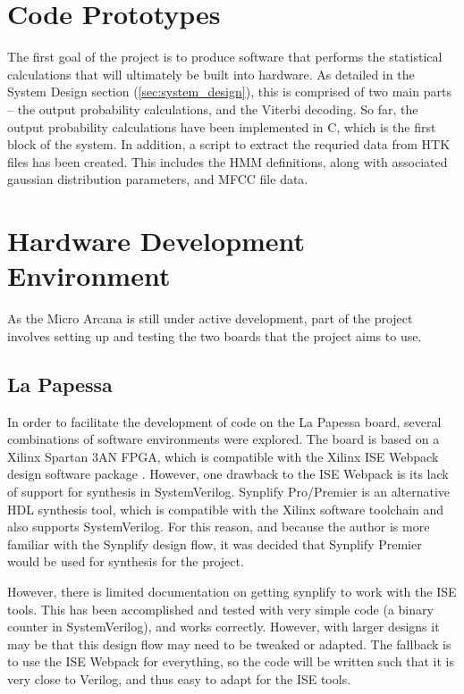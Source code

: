 \section{Code Prototypes} %
\label{sec:code_prototypes}
The first goal of the project is to produce software that performs the statistical calculations that will ultimately be built into hardware.  As detailed in the System Design section (\ref{sec:system_design}), this is comprised of two main parts -- the output probability calculations, and the Viterbi decoding.  So far, the output probability calculations have been implemented in C, which is the first block of the system.  In addition, a script to extract the requried data from HTK files has been created.  This includes the HMM definitions, along with associated gaussian distribution parameters, and MFCC file data.

\section{Hardware Development Environment} %
\label{sec:hardware}
As the Micro Arcana is still under active development, part of the project involves setting up and testing the two boards that the project aims to use.

\subsection{La Papessa} %
\label{sub:la_papessa}
In order to facilitate the development of code on the La Papessa board, several combinations of software environments were explored.  The board is based on a Xilinx Spartan 3AN FPGA, which is compatible with the Xilinx ISE Webpack design software package \cite{xilinxISE}.  However, one drawback to the ISE Webpack is its lack of support for synthesis in SystemVerilog.  Synplify Pro/Premier is an alternative HDL synthesis tool, which is compatible with the Xilinx software toolchain and also supports SystemVerilog.  For this reason, and because the author is more familiar with the Synplify design flow, it was decided that Synplify Premier would be used for synthesis for the project.

However, there is limited documentation on getting synplify to work with the ISE tools.  This has been accomplished and tested with very simple code (a binary counter in SystemVerilog), and works correctly.  However, with larger designs it may be that this design flow may need to be tweaked or adapted.  The fallback is to use the ISE Webpack for everything, so the code will be written such that it is very close to Verilog, and thus easy to adapt for the ISE tools.

